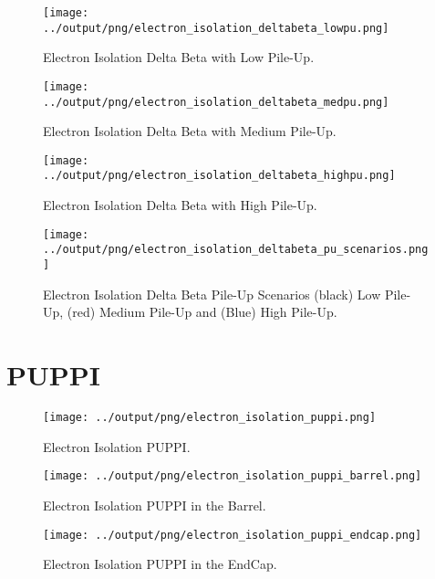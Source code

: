 \documentclass[11pt]{book}
\begin{document}
\begin{figure}[htbp]
\centering
\texttt{[image: ../output/png/electron\_isolation\_deltabeta\_lowpu.png]}
\caption{Electron Isolation Delta Beta with Low Pile-Up.}
\label{fig:electron_isolation_deltabeta_lowpu}
\end{figure}

\begin{figure}[htbp]
\centering
\texttt{[image: ../output/png/electron\_isolation\_deltabeta\_medpu.png]}
\caption{Electron Isolation Delta Beta with Medium Pile-Up.}
\label{fig:electron_isolation_deltabeta_medpu}
\end{figure}

\begin{figure}[htbp]
\centering
\texttt{[image: ../output/png/electron\_isolation\_deltabeta\_highpu.png]}
\caption{Electron Isolation Delta Beta with High Pile-Up.}
\label{fig:electron_isolation_deltabeta_highpu}
\end{figure}

\begin{figure}[htbp]
\centering
\texttt{[image: ../output/png/electron\_isolation\_deltabeta\_pu\_scenarios.png]}
\caption{Electron Isolation Delta Beta Pile-Up Scenarios (black) Low Pile-Up, (red) Medium Pile-Up and (Blue) High Pile-Up.}
\label{fig:electron_isolation_deltabeta_pu_scenarios}
\end{figure}
\clearpage


\chapter{PUPPI}
\begin{figure}[htbp]
\centering
\texttt{[image: ../output/png/electron\_isolation\_puppi.png]}
\caption{Electron Isolation PUPPI.}
\label{fig:electron_isolation_puppi}
\end{figure}

\begin{figure}[htbp]
\centering
\texttt{[image: ../output/png/electron\_isolation\_puppi\_barrel.png]}
\caption{Electron Isolation PUPPI in the Barrel.}
\label{fig:electron_isolation_puppi_barrel}
\end{figure}

\begin{figure}[htbp]
\centering
\texttt{[image: ../output/png/electron\_isolation\_puppi\_endcap.png]}
\caption{Electron Isolation PUPPI in the EndCap.}
\label{fig:electron_isolation_puppi_endcap}
\end{figure}
\end{document}
